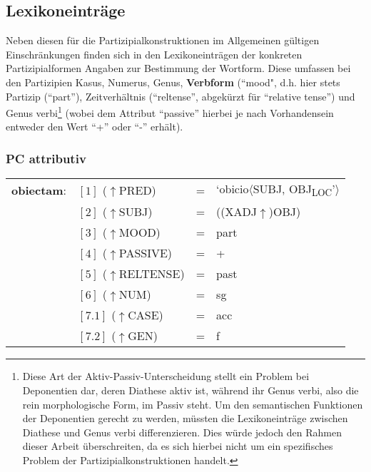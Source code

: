 \documentclass[12pt,a4paper]{article}
\begin{document}
\subsection{Lexikoneinträge}
Neben diesen für die Partizipialkonstruktionen im Allgemeinen gültigen Einschränkungen finden sich in den Lexikoneinträgen der konkreten Partizipialformen Angaben zur Bestimmung der Wortform. Diese umfassen bei den Partizipien Kasus, Numerus, Genus, \textbf{Verbform} (``mood", d.h. hier stets Partizip (``part''), Zeitverhältnis (``reltense'', abgekürzt für ``relative tense'') und Genus verbi\footnote{Diese Art der Aktiv-Passiv-Unterscheidung stellt ein Problem bei Deponentien dar, deren Diathese aktiv ist, während ihr Genus verbi, also die rein morphologische Form, im Passiv steht. Um den semantischen Funktionen der Deponentien gerecht zu werden, müssten die Lexikoneinträge zwischen Diathese und Genus verbi differenzieren. Dies würde jedoch den Rahmen dieser Arbeit überschreiten, da es sich hierbei nicht um ein spezifisches Problem der Partizipialkonstruktionen handelt.} (wobei dem Attribut ``passive'' hierbei je nach Vorhandensein entweder den Wert ``+'' oder ``-'' erhält).

\subsubsection{PC attributiv}

\begin{singlespace}
\begin{tabular}{ l  l  l  l  } 
\textbf{obiectam}: & $[1]$ \:  ($\uparrow$PRED) & = & `obicio$\langle$SUBJ, OBJ\textsubscript{LOC}'$\rangle$\\
$\qquad$ & $[2]$ \:  ($\uparrow$SUBJ) & = & ((XADJ$\uparrow$)OBJ)\\
$\qquad$ & $[3]$ \:  ($\uparrow$MOOD) & = & part\\
$\qquad$ & $[4]$ \:  ($\uparrow$PASSIVE) & = & + \\
$\qquad$ & $[5]$ \:  ($\uparrow$RELTENSE) & = & past \\
$\qquad$ & $[6]$ \:  ($\uparrow$NUM) & = & sg \\
$\qquad$ & $[7.1]$ \: ($\uparrow$CASE) & = & acc \\
$\qquad$ & $[7.2]$ \: ($\uparrow$GEN) & = & f \\
\end{tabular}
\newline
\newline
\end{singlespace}
\end{document}
